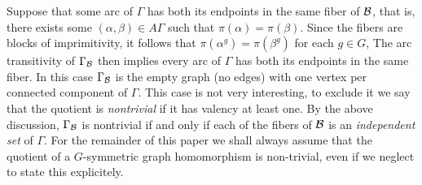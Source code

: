 Suppose that some arc of $\Gamma$ 
has both its endpoints in the same fiber of $\mathcal{B}$,
that is, there exists some $(\alpha,\beta) \in A \Gamma$
such that $\pi(\alpha) = \pi(\beta)$.
Since the fibers are blocks of imprimitivity,
it follows that $\pi(\alpha^g) = \pi(\beta^g)$ for each $g \in G$,
The arc transitivity of $\Gamma_{\mathcal{B}}$ then implies 
every arc of $\Gamma$ has both its endpoints in the same fiber. 
In this case $\Gamma_{\mathcal{B}}$ is the empty graph (no edges) 
with one vertex per connected component of $\Gamma$. 
This case is not very interesting,
to exclude it we say that the quotient is {\it nontrivial}
if it has valency at least one.
By the above discussion, $\Gamma_{\mathcal{B}}$ is nontrivial
if and only if each of the fibers of $\mathcal{B}$ is an
{\it independent set} of $\Gamma$.
For the remainder of this paper we shall always assume
that the quotient of a $G$-symmetric graph homomorphism
is non-trivial, even if we neglect to state this explicitely.


